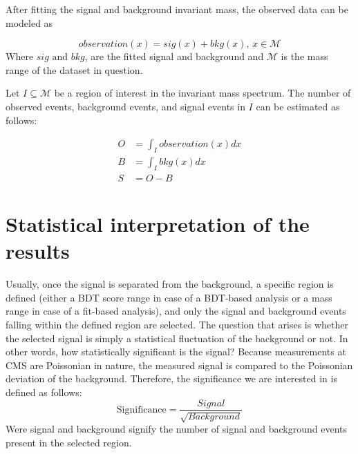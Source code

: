 After fitting the signal and background invariant mass, the observed data can be modeled as

\begin{equation}
observation(x) = sig(x) + bkg(x)\text{, }x\in \mathcal{M}
\end{equation}
Where \(sig\text{ and }bkg\), are the fitted signal and background and \(\mathcal{M}\) is the mass range of the dataset in question.

Let \(I\subseteq \mathcal{M}\) be a region of interest in the invariant mass spectrum. The number of observed events, background events, and signal events in \(I\) can be estimated as follows:

\begin{align}
O &= \int_{I} observation(x) dx \\
B &= \int_{I} bkg(x) dx\\
S &= O - B
\end{align}

\section{Statistical interpretation of the results}
\label{sec:org1cfc88b}
Usually, once the signal is separated from the background, a specific region is defined (either a BDT score range in case of a BDT-based analysis or a mass range in case of a fit-based analysis), and only the signal and background events falling within the defined region are selected. The question that arises is whether the selected signal is simply a statistical fluctuation of the background or not. In other words, how statistically significant is the signal? Because measurements at CMS are Poissonian in nature, the measured signal is compared to the Poissonian deviation of the background. Therefore, the significance we are interested in is defined as follows:
\begin{equation}
\text{Significance} = \frac{Signal}{\sqrt{Background}}
\end{equation}
Were signal and background signify the number of signal and background events present in the selected region.  
